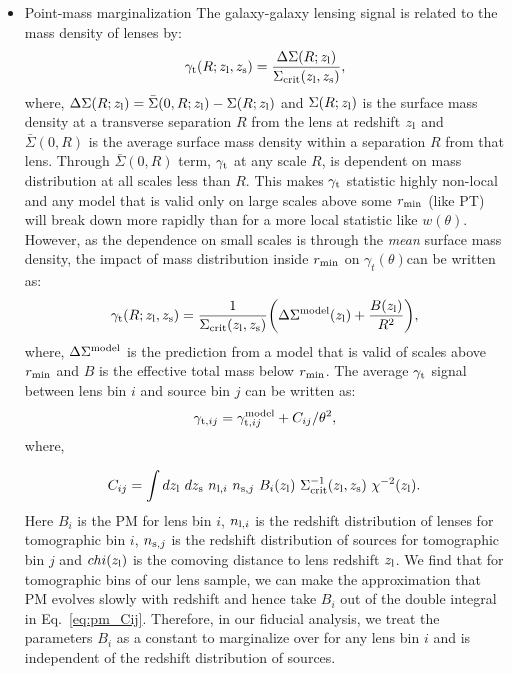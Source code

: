 \documentclass[fleqn,usenatbib]{mnras}
\newcommand{\gammat}{\ensuremath{\gamma_{t}(\theta)}}
\newcommand{\wtheta}{\ensuremath{w(\theta)}}
\begin{document}
\begin{itemize}
    \item Point-mass marginalization 
    The galaxy-galaxy lensing signal is related to the mass density of lenses by:
    \begin{equation}
        \gamma_{\rm t}(R;z_{\rm l},z_{\rm s}) = \frac{\Delta \Sigma (R;z_{\rm l})}{\Sigma_{\rm crit} (z_{\rm l},z_{\rm s})},
    \end{equation}
    where, $\Delta \Sigma(R;z_{\rm l}) = \bar{\Sigma}(0,R; z_{\rm l}) - \Sigma(R;z_{\rm l})$ and $\Sigma(R;z_{\rm l})$ is the surface mass density at a transverse separation $R$ from the lens at redshift $z_{\rm l}$ and $\bar{\Sigma}(0,R)$ is the average surface mass density within a separation $R$ from that lens. Through $\bar{\Sigma}(0,R)$ term, $\gamma_{\rm t}$  at any scale $R$, is dependent on mass distribution at all scales less than $R$. This makes $\gamma_{\rm t}$ statistic highly non-local and any model that is valid only on large scales above some $r_{\rm min}$ (like PT) will break down more rapidly than for a more local statistic like \wtheta. However, as the dependence on small scales is through the \textit{mean} surface mass density, the impact of mass distribution inside $r_{\rm min}$ on \gammat can be written as:
    \begin{equation}
        \gamma_{\rm t}(R;z_{\rm l},z_{\rm s}) = \frac{1}{\Sigma_{\rm crit}(z_{\rm l},z_{\rm s})} \bigg(\Delta \Sigma^{\rm model}(z_{\rm l}) + \frac{B(z_{\rm l})}{R^2} \bigg),
    \end{equation}
    where, $\Delta \Sigma^{\rm model}$ is the prediction from a model that is valid of scales above $r_{\rm min}$ and $B$ is the effective total mass below $r_{\rm min}$.  The average $\gamma_{\rm t}$ signal between lens bin $i$ and source bin $j$ can be written as:
    \begin{equation}
        \gamma_{{\rm t},ij} = \gamma^{\rm model}_{{\rm t},ij} + C_{ij}/\theta^2,
    \end{equation}
    where,
    
    \begin{equation}\label{eq:pm_Cij}
        C_{ij} = \int dz_{\rm l} \ dz_{\rm s} \ n_{{\rm l},i} \ n_{{\rm s},j} \ B_i(z_{\rm l}) \ \Sigma^{-1}_{\rm crit}(z_{\rm l},z_{\rm s}) \ \chi^{-2}(z_{\rm l}).
    \end{equation}
    Here $B_i$ is the PM for lens bin $i$, $n_{{\rm l},i}$ is the redshift distribution of lenses for tomographic bin $i$, $n_{{\rm s},j}$ is the redshift distribution of sources for tomographic bin $j$ and $chi(z_{\rm l})$ is the comoving distance to lens redshift $z_{\rm l}$. We find that for tomographic bins of our lens sample, we can make the approximation that PM evolves slowly with redshift and hence take $B_i$ out of the double integral in Eq.~\ref{eq:pm_Cij}. Therefore, in our fiducial analysis, we treat the parameters $B_i$ as a constant to marginalize over for any lens bin $i$ and is independent of the redshift distribution of sources. 
    

\end{itemize}
\end{document}

